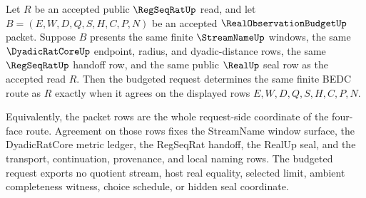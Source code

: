 \begin{theorem}
\label{thm:regseqrat-streamname-dyadic-real-budgeted-request-determinacy}
Let $R$ be an accepted public $\RegSeqRatUp$ read, and let
$B=(E,W,D,Q,S,H,C,P,N)$ be an accepted $\RealObservationBudgetUp$ packet.
Suppose $B$ presents the same finite $\StreamNameUp$ windows, the same
$\DyadicRatCoreUp$ endpoint, radius, and dyadic-distance rows, the same
$\RegSeqRatUp$ handoff row, and the same public $\RealUp$ seal row as the
accepted read $R$. Then the budgeted request determines the same finite BEDC
route as $R$ exactly when it agrees on the displayed rows
$E,W,D,Q,S,H,C,P,N$.

Equivalently, the packet rows are the whole request-side coordinate of the
four-face route. Agreement on those rows fixes the StreamName window surface,
the DyadicRatCore metric ledger, the RegSeqRat handoff, the RealUp seal, and
the transport, continuation, provenance, and local naming rows. The budgeted
request exports no quotient stream, host real equality, selected limit,
ambient completeness witness, choice schedule, or hidden seal coordinate.
\end{theorem}
